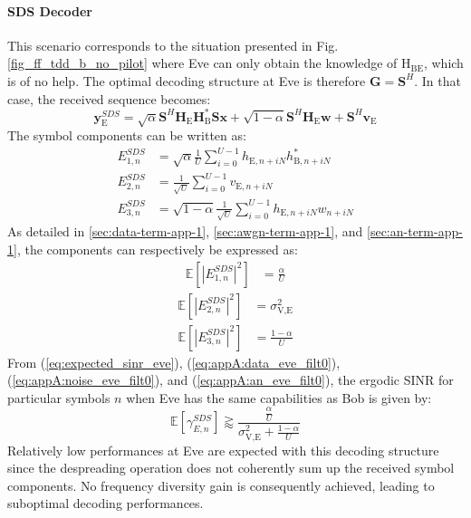 \documentclass[journal,comsoc]{IEEEtran}
\newcommand{\EX}[1]{\mathbb{E} \left[#1\right]}%
\newcommand{\HE}{\textbf{H}_{\text{E}}}
\newcommand{\ve}{\textbf{v}_{\text{E}}}
\newcommand{\spread}{\textbf{S}}
\newcommand{\w}{\textbf{w}}
\newcommand{\mat}[1]{\boldsymbol{\mathrm{#1}}}
\begin{document}
\paragraph{SDS Decoder}
\label{sec:same-decoding-strucure-as-bob}
This scenario corresponds to the situation presented in Fig.\ref{fig_ff_tdd_b_no_pilot} where Eve can only obtain the knowledge of $\mat{H}_{\text{BE}}$, which is of no help. The optimal decoding structure at Eve is therefore $\textbf{G}=\spread^H$. In that case, the received sequence becomes:
\begin{equation}
\textbf{y}_{\text{E}}^{SDS} = \sqrt{\alpha} \spread^H \HE \textbf{H}^*_{\text{B}} \spread\textbf{x} + \sqrt{1-\alpha} \spread^H \HE \w  +  \spread^H  \ve 
\label{eq:rx_eve_filt0}
\end{equation}
The symbol components can be written as:
\begin{equation}
\begin{split}
E_{1,n}^{SDS} &= \sqrt{\alpha}\frac{1}{U}\sum_{i=0}^{U-1}  h_{\text{E}, n + iN} h^*_{\text{B}, n + iN} \\
E_{2,n}^{SDS} &= \frac{1}{\sqrt{U}}\sum_{i=0}^{U-1}  v_{\text{E}, n + iN}\\
E_{3,n}^{SDS} &= \sqrt{1-\alpha}\frac{1}{\sqrt{U}}\sum_{i=0}^{U-1}  h_{\text{E}, n + iN}w_{n + iN}
\end{split}
\end{equation}
As detailed in  \ref{sec:data-term-app-1},  \ref{sec:awgn-term-app-1}, and \ref{sec:an-term-app-1}, the components can respectively be expressed as:
\begin{equation}
	\begin{split}
	\EX{|E_{1,n}^{SDS}|^2}&= \frac{\alpha}{U}
	\end{split}
	\label{eq:appA:data_eve_filt0}
\end{equation} 
\begin{equation}
	\begin{split}
	\EX{|E_{2,n}^{SDS}|^2} &=\sigma^2_{\text{V,E}}
	\end{split}
	\label{eq:appA:noise_eve_filt0}
\end{equation} 
\begin{equation}
	\begin{split}
	\EX{|E_{3,n}^{SDS}|^2}  &= \frac{1-\alpha}{U}
	\end{split}
	\label{eq:appA:an_eve_filt0}
\end{equation}
From (\ref{eq:expected_sinr_eve}), (\ref{eq:appA:data_eve_filt0}), (\ref{eq:appA:noise_eve_filt0}), and (\ref{eq:appA:an_eve_filt0}), the ergodic SINR for particular symbols $n$ when Eve has the same capabilities as Bob is given by:
\begin{equation}
\EX{\gamma_{E,n}^{SDS}} \gtrapprox \frac{\frac{\alpha}{U}}{\sigma^2_{\text{V,E}}+\frac{1-\alpha}{U}}
\label{eq:sinr_eve_filt0}
\end{equation}
Relatively low performances at Eve are expected with this decoding structure since the despreading operation does not coherently sum up the received symbol components. No frequency diversity gain is consequently achieved, leading to suboptimal decoding performances.
\end{document}
